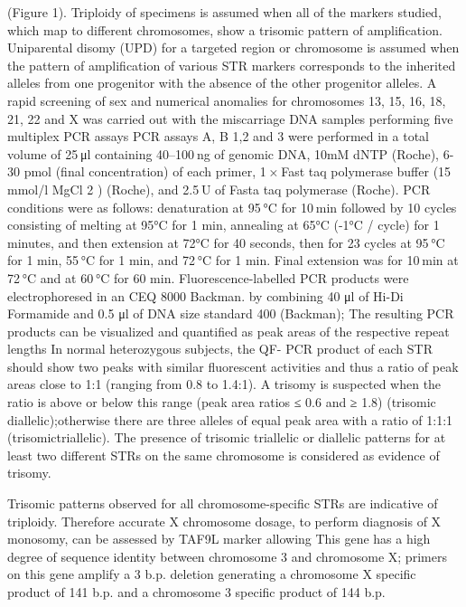 (Figure 1). Triploidy of specimens is assumed when all of the markers studied, which map to
different chromosomes, show a trisomic pattern of amplification. Uniparental disomy (UPD) for a targeted region or chromosome is assumed when the pattern of amplification of various STR
markers corresponds to the inherited alleles from one progenitor with the absence of the other progenitor alleles.
A rapid screening of sex and numerical anomalies for chromosomes 13, 15, 16, 18, 21, 22 and X
was carried out with the miscarriage DNA samples performing five multiplex PCR assays PCR
assays A, B 1,2 and 3 were performed in a total volume of 25 μl containing 40–100 ng of genomic DNA, 10mM dNTP (Roche), 6-30 pmol (final concentration) of each primer, 1 × Fast taq
polymerase buffer (15 mmol/l MgCl 2 ) (Roche), and 2.5 U of Fasta taq polymerase (Roche). PCR
conditions were as follows: denaturation at 95 °C for 10 min followed by 10 cycles consisting of melting at 95°C for 1 min, annealing at 65°C (-1°C / cycle) for 1 minutes, and then extension at 72°C for 40 seconds, then for 23 cycles at 95 °C for 1 min, 55 °C for 1 min, and 72 °C for 1 min.
Final extension was for 10 min at 72 °C and at 60 °C for 60 min. Fluorescence-labelled PCR
products were electrophoresed in an CEQ 8000 Backman. by combining 40 μl of Hi-Di Formamide
and 0.5 μl of DNA size standard 400 (Backman); The resulting PCR products can be visualized and quantified as peak areas of the respective repeat lengths In normal heterozygous subjects, the QF- PCR product of each STR should show two peaks with similar fluorescent activities and thus a ratio of peak areas close to 1:1 (ranging from 0.8 to 1.4:1). A trisomy is suspected when the ratio is  above or below this range (peak area ratios ≤ 0.6 and ≥ 1.8) (trisomic diallelic);otherwise there are three alleles of equal peak area with a ratio of 1:1:1 (trisomictriallelic). The presence of trisomic triallelic or diallelic patterns for at least two different STRs on the same chromosome is considered as evidence of trisomy.

Trisomic patterns observed for all chromosome-specific STRs are indicative of triploidy. Therefore accurate X chromosome dosage, to perform diagnosis of X monosomy, can be assessed by TAF9L marker allowing This gene has a high degree of sequence identity between chromosome 3 and chromosome X; primers on this gene amplify a 3 b.p. deletion generating a chromosome X specific product of 141 b.p. and a chromosome 3 specific product of 144 b.p.